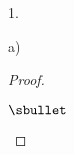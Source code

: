 \begin{noliste}{1.}
\begin{noliste}{a)}
\begin{proof}
\begin{remarkL}{.98}
\begin{noliste}{$\sbullet$}
        \end{noliste}
      \end{remarkL}


      \newpage
      

\end{proof}
\end{noliste}
\end{noliste}
